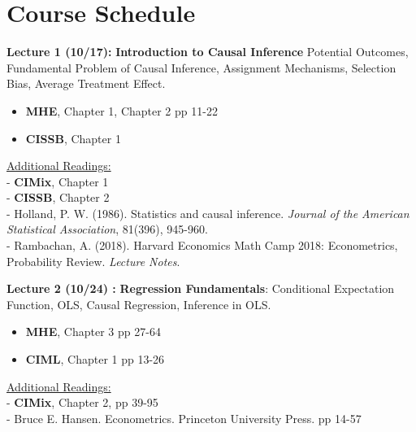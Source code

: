 \documentclass[12pt]{article}
\begin{document}
\section*{Course Schedule}

\vspace{2em}
\noindent\textbf{Lecture 1 (10/17):} \textbf{Introduction to Causal Inference} Potential Outcomes, Fundamental Problem of Causal Inference, Assignment Mechanisms, Selection Bias, Average Treatment Effect. \\
\vspace{1em}
\begin{itemize}
    \item \textbf{MHE}, Chapter 1, Chapter 2 pp 11-22
    \item  \textbf{CISSB}, Chapter 1 \\
\end{itemize}
\vspace{1em}
\underline{Additional Readings:} \\
\hspace{1em} - \textbf{CIMix}, Chapter 1 \\
\hspace{1em} - \textbf{CISSB}, Chapter 2 \\
\hspace{1em} - Holland, P. W. (1986). Statistics and causal inference. \textit{Journal of the American Statistical Association}, 81(396), 945-960.\\
\hspace{1em} - Rambachan, A. (2018). Harvard Economics Math Camp 2018: Econometrics, Probability Review. \textit{Lecture Notes}.

\vspace{2em}
\noindent\textbf{Lecture 2 (10/24) :}  \textbf{Regression Fundamentals}: Conditional Expectation Function, OLS, Causal Regression, Inference in OLS.\\
\vspace{1em}
\begin{itemize}
    \item \textbf{MHE}, Chapter 3 pp 27-64
    \item \textbf{CIML}, Chapter 1 pp 13-26
\end{itemize}

\underline{Additional Readings:} \\
\vspace{1em} - \textbf{CIMix}, Chapter 2, pp 39-95 \\
\hspace{1em} - Bruce E. Hansen. Econometrics. Princeton University Press. pp 14-57
\end{document}
